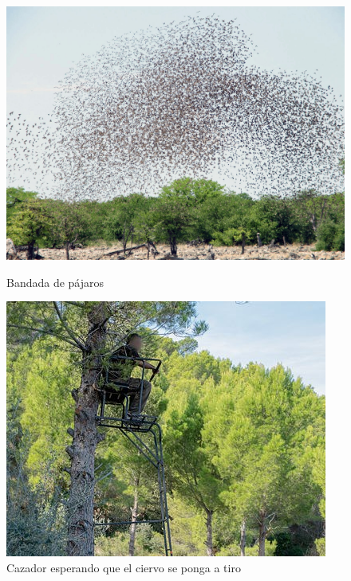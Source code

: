 \begin{figure}[h]
    \centering
    \begin{minipage}{.3\textwidth}
        \centering
        \includegraphics[width=\linewidth]{./imagenes/bandada.jpg}
        \caption{Bandada de pájaros}
    \end{minipage}
    \hfill
    \begin{minipage}{.3\textwidth}
        \centering
        \includegraphics[width=\linewidth]{./imagenes/caza.jpg}
        \caption{Cazador esperando que el ciervo se ponga a tiro}
    \end{minipage}
    \hfill
    \begin{minipage}{.3\textwidth}

\end{minipage}
\end{figure}
